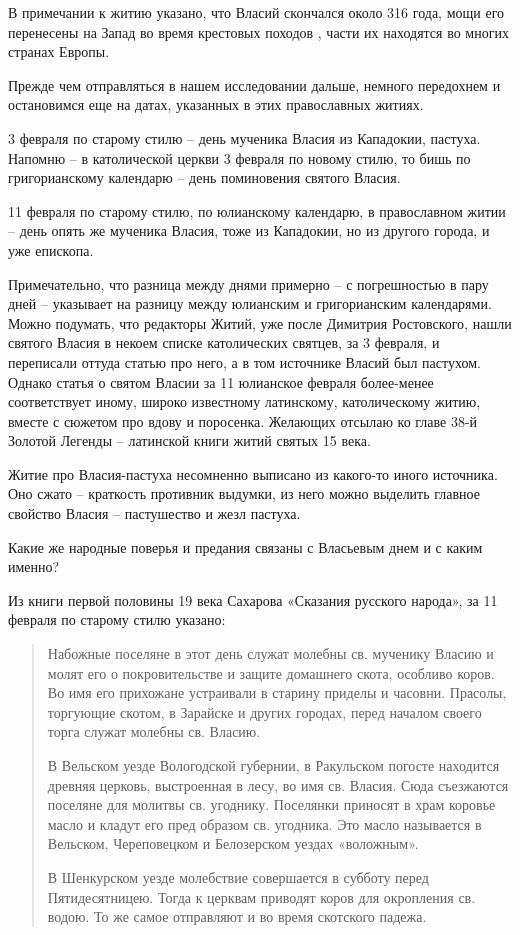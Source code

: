    В примечании к житию указано, что Власий скончался около 316 года, мощи его перенесены на Запад во время крестовых походов , части их находятся во многих странах Европы.

   Прежде чем отправляться в нашем исследовании дальше, немного передохнем и остановимся еще на датах, указанных в этих православных житиях.

   3 февраля по старому стилю – день мученика Власия из Кападокии, пастуха. Напомню – в католической церкви 3 февраля по новому стилю, то бишь по григорианскому календарю – день поминовения святого Власия.

   11 февраля по старому стилю, по юлианскому календарю, в православном житии – день опять же мученика Власия, тоже из Кападокии, но из другого города, и уже епископа.

   Примечательно, что разница между днями примерно – с погрешностью в пару дней – указывает на разницу между юлианским и григорианским календарями. Можно подумать, что редакторы Житий, уже после Димитрия Ростовского, нашли святого Власия в некоем списке католических святцев, за 3 февраля, и переписали оттуда статью про него, а в том источнике Власий был пастухом. Однако статья о святом Власии за 11 юлианское февраля более-менее соответствует иному, широко известному латинскому, католическому житию, вместе с сюжетом про вдову и поросенка. Желающих отсылаю ко главе 38-й Золотой Легенды – латинской книги житий святых 15 века.

    Житие про Власия-пастуха несомненно выписано из какого-то иного источника. Оно сжато – краткость противник выдумки, из него можно выделить главное свойство Власия – пастушество и жезл пастуха.

   Какие же народные поверья и предания связаны с Власьевым днем и с каким именно?

   Из книги первой половины 19 века Сахарова «Сказания русского народа», за 11 февраля по старому стилю указано:

\begin{quotation}
Набожные поселяне в этот день служат молебны св. мученику Власию и молят его о покровительстве и защите домашнего скота, особливо коров. Во имя его прихожане устраивали в старину приделы и часовни. Прасолы, торгующие скотом, в Зарайске и других городах, перед началом своего торга служат молебны св. Власию. 

В Вельском уезде Вологодской губернии, в Ракульском погосте находится древняя церковь, выстроенная в лесу, во имя св. Власия. Сюда съезжаются поселяне для молитвы св. угоднику. Поселянки приносят в храм коровье масло и кладут его пред образом св. угодника. Это масло называется в Вельском, Череповецком и Белозерском уездах «воложным». 

В Шенкурском уезде молебствие совершается в субботу перед Пятидесятницею. Тогда к церквам приводят коров для окропления св. водою. То же самое отправляют и во время скотского падежа.
\end{quotation}

